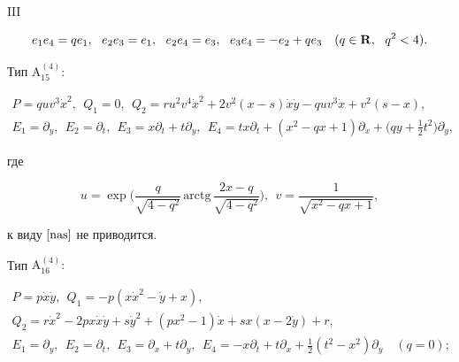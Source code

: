 \begin{thms}
$\mathrm {III}$


$$


e_1e_4=qe_1,\ \ e_2e_3=e_1,\ \


e_2e_4=e_3,\ \ e_3e_4=-e_2+qe_3\quad (q\in{\bold R},\ \ q^2<4).


$$








Тип $\mathrm{A^{(4)}_{15}}{:}$


\begin{gather*}


P=quv^3\Dot x^2, \ \  Q_1=0, \ \ Q_2=


ru^2v^4\Dot x^2+2v^{2}(x-s)\Dot x\Dot y


-quv^{3}\Dot x+v^{2}(s-x),\\


E_1=\partial_y,\ \ E_2=\partial_ t,


\ \ E_3=x\partial_t+t\partial_y,\ \


E_4=tx\partial_t+(x^2-qx+1)\partial_x+


\bigg(qy+\frac12 t^2\bigg)\partial_y,


\end{gather*}


где


$$


u=\exp\bigg({\frac{q}{\sqrt{4-q^2}}\,\mathrm{arctg}\,


{\frac{2x-q}{\sqrt{4-q^2}}}}\bigg), \ \


v={\frac{1}{\sqrt{x^2-qx+1}}},


$$


к виду $\eqref{nas}$ не приводится.





Тип $\mathrm{A^{(4)}_{16}}{:}$


\begin{gather*}


P=p\Dot x\Dot y, \ \


Q_1=-p(x\Dot x^2-\Dot y +x),\\


Q_2=r\Dot x^2-2px\Dot x\Dot y+s\Dot y^2+(px^2-1)\Dot x


+sx(x-2\Dot y)+r,\\


E_1=\partial_y,\ \ E_2=\partial_ t,


\ \ E_3=\partial_x+t\partial_y,


\ \ E_4=-x\partial_t+t\partial_x+\frac12(t^2-x^2)\partial_y\quad (q=0);



\end{gather*}
\end{thms}
